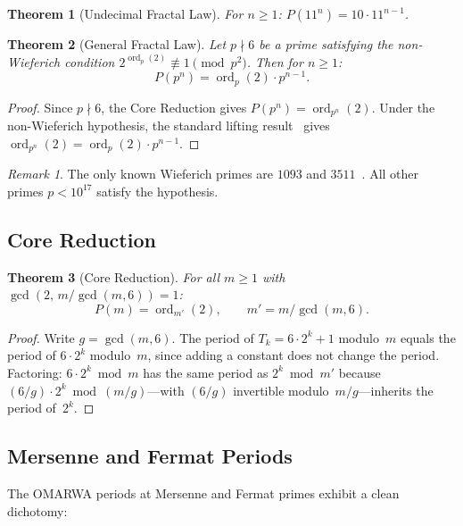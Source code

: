 \documentclass[11pt, a4paper]{article}
\theoremstyle{plain}
\newtheorem{theorem}{Theorem}[section]
\theoremstyle{definition}
\theoremstyle{remark}
\newtheorem{remark}{Remark}[section]
\newcommand{\ord}{\operatorname{ord}}
\begin{document}
\begin{theorem}[Undecimal Fractal Law]\label{thm:undecimal}
For $n \geq 1$: $P(11^n) = 10 \cdot 11^{n-1}$.
\end{theorem}

\begin{theorem}[General Fractal Law]\label{thm:general-fractal}
Let $p \nmid 6$ be a prime satisfying the non-Wieferich condition
$2^{\ord_p(2)} \not\equiv 1 \pmod{p^2}$. Then for $n \geq 1$:
\[
  P(p^n) = \ord_p(2) \cdot p^{n-1}.
\]
\end{theorem}

\begin{proof}
Since $p \nmid 6$, the Core Reduction gives
$P(p^n) = \ord_{p^n}(2)$. Under the non-Wieferich hypothesis, the
standard lifting result~\cite{narkiewicz} gives
$\ord_{p^n}(2) = \ord_p(2) \cdot p^{n-1}$.
\end{proof}

\begin{remark}\label{rem:wieferich}
The only known Wieferich primes are $1093$ and $3511$~\cite{wieferich}.
All other primes $p < 10^{17}$ satisfy the hypothesis.
\end{remark}

\subsection{Core Reduction}

\begin{theorem}[Core Reduction]\label{thm:core}
For all $m \geq 1$ with $\gcd(2,\, m/\gcd(m,6)) = 1$:
\[
  P(m) = \ord_{m'}(2), \qquad m' = m / \gcd(m, 6).
\]
\end{theorem}

\begin{proof}
Write $g = \gcd(m, 6)$. The period of $T_k = 6 \cdot 2^k + 1$
modulo~$m$ equals the period of $6 \cdot 2^k$ modulo~$m$, since adding
a constant does not change the period. Factoring:
$6 \cdot 2^k \bmod m$ has the same period as $2^k \bmod m'$ because
$(6/g) \cdot 2^k \bmod (m/g)$---with $(6/g)$ invertible
modulo~$m/g$---inherits the period of~$2^k$.
\end{proof}

\subsection{Mersenne and Fermat Periods}\label{sec:mersenne}

The OMARWA periods at Mersenne and Fermat primes exhibit a clean
dichotomy:
\end{document}
